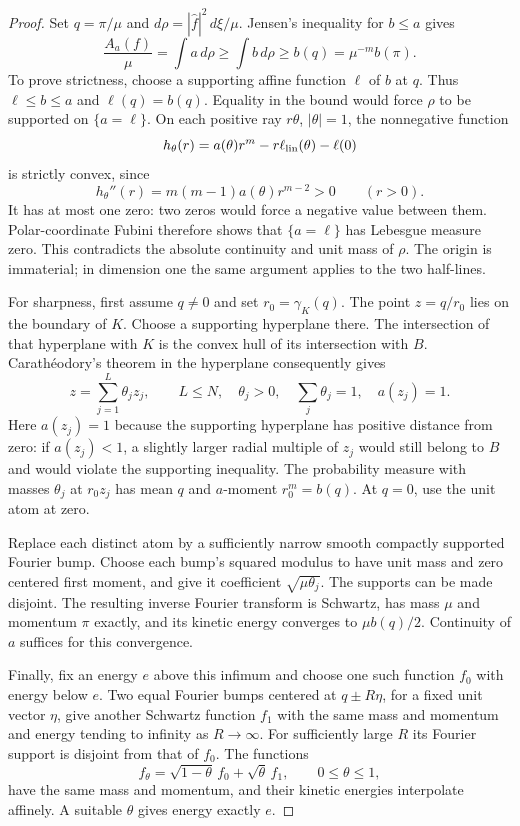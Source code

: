 \begin{proof}
Set $q=\pi/\mu$ and $d\rho=|\widehat f|^2\,d\xi/\mu$. Jensen's inequality for $b\le a$ gives
\[
 \frac{A_a(f)}\mu=\int a\,d\rho\ge\int b\,d\rho\ge b(q)
 =\mu^{-m}b(\pi).
\]
To prove strictness, choose a supporting affine function $\ell$ of $b$ at $q$. Thus $\ell\le b\le a$ and $\ell(q)=b(q)$. Equality in the bound would force $\rho$ to be supported on $\{a=\ell\}$. On each positive ray $r\theta$, $|\theta|=1$, the nonnegative function
\[
 h_\theta(r)=a(\theta)r^m-r\ell_{\rm lin}(\theta)-\ell(0)
\]
is strictly convex, since
\[
 h_\theta''(r)=m(m-1)a(\theta)r^{m-2}>0\qquad(r>0).
\]
It has at most one zero: two zeros would force a negative value between them. Polar-coordinate Fubini therefore shows that $\{a=\ell\}$ has Lebesgue measure zero. This contradicts the absolute continuity and unit mass of $\rho$. The origin is immaterial; in dimension one the same argument applies to the two half-lines.

For sharpness, first assume $q\ne0$ and set $r_0=\gamma_K(q)$. The point $z=q/r_0$ lies on the boundary of $K$. Choose a supporting hyperplane there. The intersection of that hyperplane with $K$ is the convex hull of its intersection with $B$. Carath\'eodory's theorem in the hyperplane consequently gives
\[
 z=\sum_{j=1}^{L}\theta_j z_j,\qquad
 L\le N,\quad\theta_j>0,\quad\sum_j\theta_j=1,\quad a(z_j)=1.
\]
Here $a(z_j)=1$ because the supporting hyperplane has positive distance from zero: if $a(z_j)<1$, a slightly larger radial multiple of $z_j$ would still belong to $B$ and would violate the supporting inequality. The probability measure with masses $\theta_j$ at $r_0z_j$ has mean $q$ and $a$-moment $r_0^m=b(q)$. At $q=0$, use the unit atom at zero.

Replace each distinct atom by a sufficiently narrow smooth compactly supported Fourier bump. Choose each bump's squared modulus to have unit mass and zero centered first moment, and give it coefficient $\sqrt{\mu\theta_j}$. The supports can be made disjoint. The resulting inverse Fourier transform is Schwartz, has mass $\mu$ and momentum $\pi$ exactly, and its kinetic energy converges to $\mu b(q)/2$. Continuity of $a$ suffices for this convergence.

Finally, fix an energy $e$ above this infimum and choose one such function $f_0$ with energy below $e$. Two equal Fourier bumps centered at $q\pm R\eta$, for a fixed unit vector $\eta$, give another Schwartz function $f_1$ with the same mass and momentum and energy tending to infinity as $R\to\infty$. For sufficiently large $R$ its Fourier support is disjoint from that of $f_0$. The functions
\[
 f_\theta=\sqrt{1-\theta}\,f_0+\sqrt\theta\,f_1,
 \qquad0\le\theta\le1,
\]
have the same mass and momentum, and their kinetic energies interpolate affinely. A suitable $\theta$ gives energy exactly $e$.
\end{proof}

